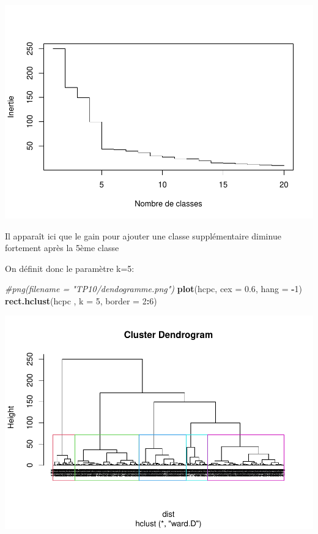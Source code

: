 \documentclass[
]{book}
\newenvironment{Shaded}{\begin{snugshade}}{\end{snugshade}}
\newcommand{\AttributeTok}[1]{\textcolor[rgb]{0.13,0.29,0.53}{#1}}
\newcommand{\CommentTok}[1]{\textcolor[rgb]{0.56,0.35,0.01}{\textit{#1}}}
\newcommand{\DecValTok}[1]{\textcolor[rgb]{0.00,0.00,0.81}{#1}}
\newcommand{\FloatTok}[1]{\textcolor[rgb]{0.00,0.00,0.81}{#1}}
\newcommand{\FunctionTok}[1]{\textcolor[rgb]{0.13,0.29,0.53}{\textbf{#1}}}
\newcommand{\NormalTok}[1]{#1}
\newcommand{\SpecialCharTok}[1]{\textcolor[rgb]{0.81,0.36,0.00}{\textbf{#1}}}
\begin{document}
\includegraphics{bookdown-demo_files/figure-latex/unnamed-chunk-96-1.pdf}

Il apparaît ici que le gain pour ajouter une classe supplémentaire diminue fortement après la 5ème classe

On définit donc le paramètre k=5:

\begin{Shaded}
\begin{Highlighting}[]
\CommentTok{\#png(filename = "TP10/dendogramme.png")}
\FunctionTok{plot}\NormalTok{(hcpc, }\AttributeTok{cex =} \FloatTok{0.6}\NormalTok{, }\AttributeTok{hang =} \SpecialCharTok{{-}}\DecValTok{1}\NormalTok{)}
\FunctionTok{rect.hclust}\NormalTok{(hcpc , }\AttributeTok{k =} \DecValTok{5}\NormalTok{, }\AttributeTok{border =} \DecValTok{2}\SpecialCharTok{:}\DecValTok{6}\NormalTok{)}
\end{Highlighting}
\end{Shaded}

\includegraphics{bookdown-demo_files/figure-latex/unnamed-chunk-97-1.pdf}
\end{document}
